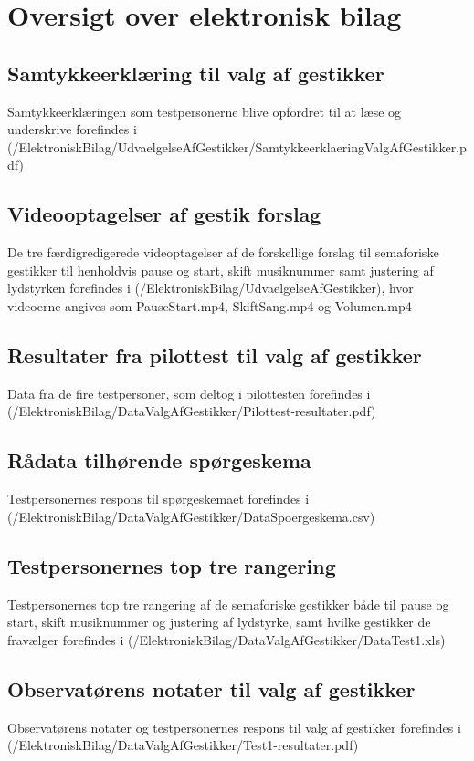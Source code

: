 \chapter{Oversigt over elektronisk bilag}
\label{app:OversigtOverElektroniskBilag}
%
%
\section{Samtykkeerklæring til valg af gestikker}
\label{app:SamtykkeerklaeringValgAfGestikker}
%
Samtykkeerklæringen som testpersonerne blive opfordret til at læse og underskrive forefindes i (/ElektroniskBilag/UdvaelgelseAfGestikker/SamtykkeerklaeringValgAfGestikker.pdf)
%
\section{Videooptagelser af gestik forslag}
\label{app:VideooptagelseGestikForslag}
%
De tre færdigredigerede videoptagelser af de forskellige forslag til semaforiske gestikker til henholdvis pause og start, skift musiknummer samt justering af lydstyrken forefindes i (/ElektroniskBilag/UdvaelgelseAfGestikker), hvor videoerne angives som PauseStart.mp4, SkiftSang.mp4 og Volumen.mp4
%
\section{Resultater fra pilottest til valg af gestikker}
\label{app:ResultaterPilottestValgAfGestikker}
%
Data fra de fire testpersoner, som deltog i pilottesten forefindes i \\
(/ElektroniskBilag/DataValgAfGestikker/Pilottest-resultater.pdf)
%
\section{Rådata tilhørende spørgeskema}
\label{app:RaaDataSpoergeskema}
%
Testpersonernes respons til spørgeskemaet forefindes i (/ElektroniskBilag/DataValgAfGestikker/DataSpoergeskema.csv)
%
\section{Testpersonernes top tre rangering}
\label{app:TestpersonernesTopTre}
%
Testpersonernes top tre rangering af de semaforiske gestikker både til pause og start, skift musiknummer og justering af lydstyrke, samt hvilke gestikker de fravælger forefindes i (/ElektroniskBilag/DataValgAfGestikker/DataTest1.xls)
%
\section{Observatørens notater til valg af gestikker}
\label{app:NoterValgAfGestikker}
%
Observatørens notater og testpersonernes respons til valg af gestikker forefindes i (/ElektroniskBilag/DataValgAfGestikker/Test1-resultater.pdf)
%
